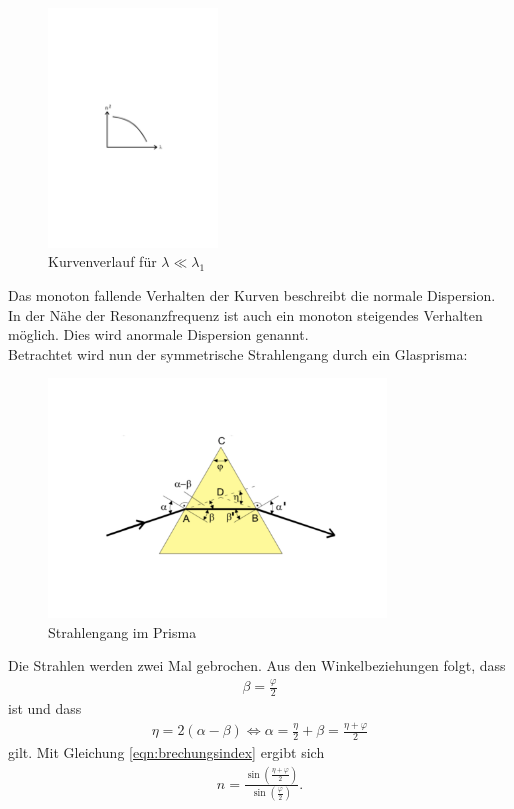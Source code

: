 \begin{figure}[h!]
  \centering
  \includegraphics[width=0.4\textwidth]{kleiner.pdf}
  \caption{Kurvenverlauf für $\lambda \ll \lambda_{\text{1}}$ \cite{1}}
  \label{fig:kleiner}
\end{figure}
Das monoton fallende Verhalten der Kurven beschreibt die normale Dispersion.
In der Nähe der Resonanzfrequenz ist auch ein monoton steigendes Verhalten möglich.
Dies wird anormale Dispersion genannt.
\\Betrachtet wird nun der symmetrische Strahlengang durch ein Glasprisma:
\begin{figure}[h!]
  \centering
  \includegraphics[width=0.8\textwidth]{prisma.pdf}
  \caption{Strahlengang im Prisma \cite{1}}
  \label{fig:prisma}
\end{figure}
Die Strahlen werden zwei Mal gebrochen.
Aus den Winkelbeziehungen folgt, dass
\begin{align*}
  \beta=\frac{\varphi}{2}
\end{align*}
ist und dass
\begin{align*}
  \eta= 2(\alpha - \beta) \Leftrightarrow \alpha = \frac{\eta}{2}+\beta = \frac{\eta+\varphi}{2}
\end{align*}
gilt.
Mit Gleichung \eqref{eqn:brechungsindex} ergibt sich
\begin{align}
  n= \frac{ \sin{ \left( \frac{\eta+\varphi}{2} \right)} }{ \sin{ \left( \frac{\varphi}{2} \right)} }.
\end{align}


\FloatBarrier
